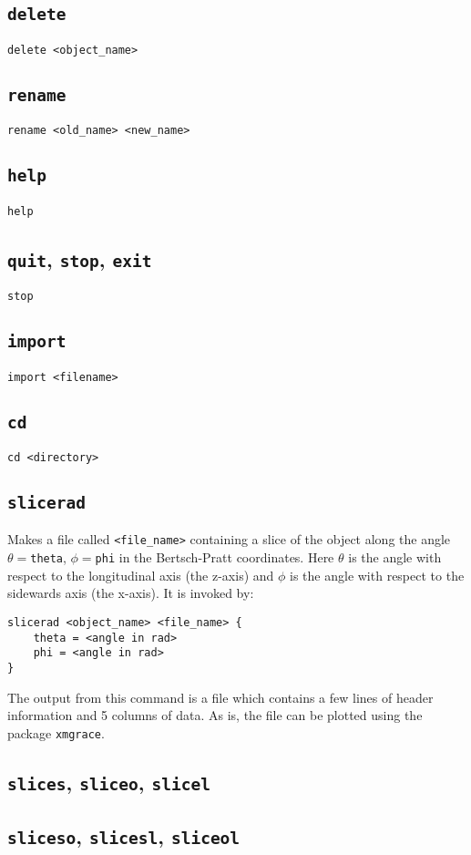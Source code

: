 \subsection{{\tt delete}}
\begin{verbatim}
delete <object_name> 
\end{verbatim}

\subsection{{\tt rename}}
\begin{verbatim}
rename <old_name> <new_name> 
\end{verbatim}

\subsection{{\tt help}}
\begin{verbatim}
help
\end{verbatim}

\subsection{{\tt quit}, {\tt stop}, {\tt exit}}
\begin{verbatim}
stop
\end{verbatim}

\subsection{{\tt import}}
\begin{verbatim}
import <filename> 
\end{verbatim}

\subsection{{\tt cd}}
\begin{verbatim}
cd <directory> 
\end{verbatim}

\subsection{{\tt slicerad}}
Makes a file called {\tt <file\_name>} containing a slice of the object along
the angle $\theta=${\tt theta}, $\phi=${\tt phi} in the Bertsch-Pratt
coordinates.  Here $\theta$ is the angle with respect to the longitudinal axis
(the z-axis) and $\phi$ is the angle with respect to the sidewards axis (the
x-axis).  It is invoked by:
\begin{verbatim}
slicerad <object_name> <file_name> {
    theta = <angle in rad>
    phi = <angle in rad>
}
\end{verbatim}
The output from this command is a file which contains a few lines of header
information and 5 columns of data.  As is, the file can be plotted using the 
package {\tt xmgrace}.

\subsection{{\tt slices}, {\tt sliceo}, {\tt slicel}}

\subsection{{\tt sliceso}, {\tt slicesl}, {\tt sliceol}}


